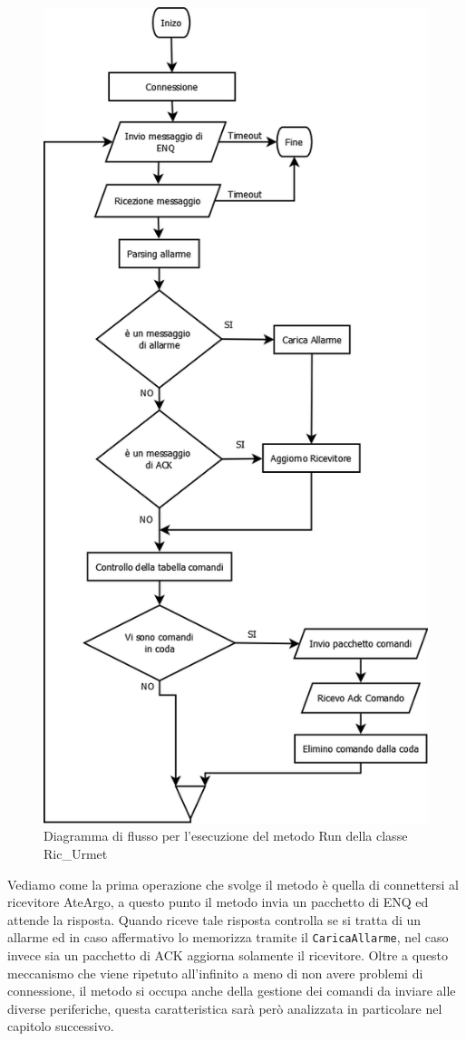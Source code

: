 \begin{figure}
	\centering
	\includegraphics[width=0.7\linewidth]{pictures/runurmet.png}
	\caption{Diagramma di flusso per l'esecuzione del metodo Run della classe Ric\_Urmet}\label{fig:urmetrun}
\end{figure}
Vediamo come la prima operazione che svolge il metodo è quella di connettersi al ricevitore AteArgo, a questo punto il metodo invia un pacchetto di ENQ ed attende la risposta. Quando riceve tale risposta controlla se si tratta di un allarme ed in caso affermativo lo memorizza tramite il \texttt{CaricaAllarme}, nel caso invece sia un pacchetto di ACK aggiorna solamente il ricevitore. Oltre a questo meccanismo che viene ripetuto all'infinito a meno di non avere problemi di connessione, il metodo si occupa anche della gestione dei comandi da inviare alle diverse periferiche, questa caratteristica sarà però analizzata in particolare nel capitolo successivo.
